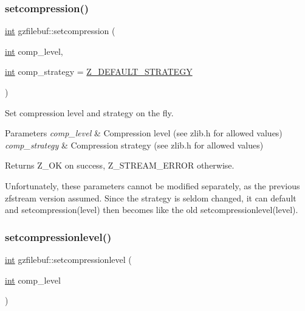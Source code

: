 \subsubsection{\texorpdfstring{setcompression()}{setcompression()}}
{\footnotesize\ttfamily \mbox{\hyperlink{ioapi_8h_a787fa3cf048117ba7123753c1e74fcd6}{int}} gzfilebuf\+::setcompression (\begin{DoxyParamCaption}\item[{\mbox{\hyperlink{ioapi_8h_a787fa3cf048117ba7123753c1e74fcd6}{int}}}]{comp\+\_\+level,  }\item[{\mbox{\hyperlink{ioapi_8h_a787fa3cf048117ba7123753c1e74fcd6}{int}}}]{comp\+\_\+strategy = {\ttfamily \mbox{\hyperlink{zlib_8h_a580d7c2527e653ddd783109271750849}{Z\+\_\+\+D\+E\+F\+A\+U\+L\+T\+\_\+\+S\+T\+R\+A\+T\+E\+GY}}} }\end{DoxyParamCaption})}



Set compression level and strategy on the fly. 


\begin{DoxyParams}{Parameters}
{\em comp\+\_\+level} & Compression level (see zlib.\+h for allowed values) \\
\hline
{\em comp\+\_\+strategy} & Compression strategy (see zlib.\+h for allowed values) \\
\hline
\end{DoxyParams}
\begin{DoxyReturn}{Returns}
Z\+\_\+\+OK on success, Z\+\_\+\+S\+T\+R\+E\+A\+M\+\_\+\+E\+R\+R\+OR otherwise.
\end{DoxyReturn}
Unfortunately, these parameters cannot be modified separately, as the previous zfstream version assumed. Since the strategy is seldom changed, it can default and setcompression(level) then becomes like the old setcompressionlevel(level). \mbox{\label{classgzfilebuf_a8bbfda3e29baf20e4330e3a9d7ee4a54}} 
\subsubsection{\texorpdfstring{setcompressionlevel()}{setcompressionlevel()}}
{\footnotesize\ttfamily \mbox{\hyperlink{ioapi_8h_a787fa3cf048117ba7123753c1e74fcd6}{int}} gzfilebuf\+::setcompressionlevel (\begin{DoxyParamCaption}\item[{\mbox{\hyperlink{ioapi_8h_a787fa3cf048117ba7123753c1e74fcd6}{int}}}]{comp\+\_\+level }\end{DoxyParamCaption})}

